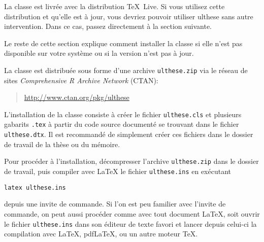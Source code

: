 \documentclass[11pt,french]{article}
\newcommand{\class}[1]{\textsf{#1}}
\newcommand{\fichier}[1]{\texttt{#1}}
\begin{document}
La classe est livrée avec la distribution {\TeX}~Live. Si vous
utilisez cette distribution et qu'elle est à jour, vous devriez
pouvoir utiliser \class{ulthese} sans autre intervention. Dans ce
cas, passez directement à la section suivante.

Le reste de cette section explique comment installer la classe si
elle n'est pas disponible sur votre système ou si la version n'est
pas à jour.

La classe est distribuée sous forme d'une archive
\fichier{ulthese.zip} via le réseau de sites \emph{Comprehensive R
  Archive Network} (CTAN):
\begin{quote}
  \url{http://www.ctan.org/pkg/ulthese}
\end{quote}

L'installation de la classe consiste à créer le fichier
\fichier{ulthese.cls} et plusieurs gabarits \fichier{.tex} à partir du
code source documenté se trouvant dans le fichier
\fichier{ulthese.dtx}. Il est recommandé de simplement créer ces
fichiers dans le dossier de travail de la thèse ou du mémoire.

Pour procéder à l'installation, décompresser l'archive
\fichier{ulthese.zip} dans le dossier de travail, puis compiler avec
{\LaTeX} le fichier \fichier{ulthese.ins} en exécutant
\begin{verbatim}
latex ulthese.ins
\end{verbatim}
depuis une invite de commande. Si l'on est peu familier avec l'invite
de commande, on peut aussi procéder comme avec tout document {\LaTeX},
soit ouvrir le fichier \fichier{ulthese.ins} dans son éditeur de texte
favori et lancer depuis celui-ci la compilation avec {\LaTeX},
pdf{\LaTeX}, {\XeLaTeX} ou un autre moteur {\TeX}.
\end{document}
